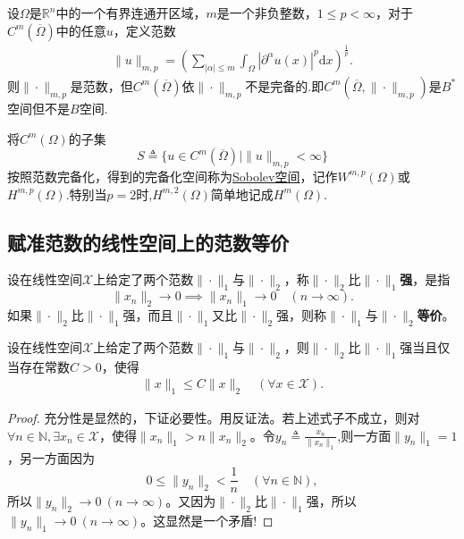 \documentclass[../../main.tex]{subfiles}%
\begin{document}
\begin{proposition}
设$\Omega$是$\mathbb{R}^n$中的一个有界连通开区域，$m$是一个非负整数，$1 \leqslant p < \infty$，对于$C^m(\overline{\Omega})$中的任意$u$，定义范数
\begin{align*}
\|u\|_{m,p} = \left( \sum\limits_{|\alpha|\leqslant m} \int_\Omega |\partial^\alpha u(x)|^p \mathrm{d}x \right)^{\frac{1}{p}}.
\end{align*}
则$\|\cdot\|_{m,p}$是范数，但$C^m(\overline{\Omega})$依$\|\cdot\|_{m,p}$不是完备的.即$C^m(\overline{\Omega},\|\cdot\|_{m,p})$是$B^*$空间但不是$B$空间.

将$C^m(\Omega)$的子集
$$S \triangleq \{u \in C^m(\overline{\Omega}) \mid \|u\|_{m,p} < \infty\}$$
按照范数完备化，得到的完备化空间称为\hyperref[definition:Sobolev空间]{Sobolev空间}，记作$W^{m,p}(\Omega)$或$H^{m,p}(\Omega)$.特别当$p=2$时,$H^{m,2}(\Omega)$简单地记成$H^{m}(\Omega)$.
\end{proposition}


\subsection{赋准范数的线性空间上的范数等价}

\begin{definition}
设在线性空间$\mathscr{X}$上给定了两个范数$\|\cdot\|_1$与$\|\cdot\|_2$，称$\|\cdot\|_2$比$\|\cdot\|_1$\textbf{强}，是指
$$\|x_n\|_2 \to 0 \implies \|x_n\|_1 \to 0 \quad (n \to \infty).$$
如果$\|\cdot\|_2$比$\|\cdot\|_1$强，而且$\|\cdot\|_1$又比$\|\cdot\|_2$强，则称$\|\cdot\|_1$与$\|\cdot\|_2$\textbf{等价}。
\end{definition}

\begin{proposition}\label{proposition:范数强的充要条件}
设在线性空间$\mathscr{X}$上给定了两个范数$\|\cdot\|_1$与$\|\cdot\|_2$，则$\|\cdot\|_2$比$\|\cdot\|_1$强当且仅当存在常数$C>0$，使得
\begin{align*}
\|x\|_1 \leqslant C\|x\|_2 \quad (\forall x \in \mathscr{X}).
\end{align*}
\end{proposition}
\begin{proof}
充分性是显然的，下证必要性。用反证法。若上述式子不成立，则对$\forall n \in \mathbb{N}, \exists x_n \in \mathscr{X}$，使得$\|x_n\|_1 > n\|x_n\|_2$。令$y_n\triangleq \frac{x_n}{\parallel x_n\parallel _1}$,则一方面$\|y_n\|_1=1$，另一方面因为
$$0 \leqslant \|y_n\|_2 < \frac{1}{n} \quad (\forall n \in \mathbb{N}),$$
所以$\|y_n\|_2 \to 0 \ (n \to \infty)$。又因为$\|\cdot\|_2$比$\|\cdot\|_1$强，所以$\|y_n\|_1 \to 0 \ (n \to \infty)$。这显然是一个矛盾!
\end{proof}
\end{document}

